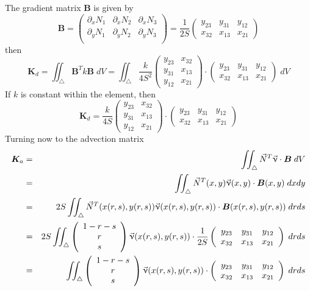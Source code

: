 The gradient matrix ${\bm B}$ is given by 
\[
{\bm B} = 
\left(
\begin{array}{ccc}
\partial_x N_1 & \partial_x N_2 & \partial_x N_3 \\
\partial_y N_1 & \partial_y N_2 & \partial_y N_3 \\
\end{array}
\right)
=
\frac{1}{2S}
\left(
\begin{array}{ccc}
y_{23} & y_{31} & y_{12} \\
x_{32} & x_{13} & x_{21}
\end{array}
\right)
\]
then 
\[
{\bm K}_d 
= \iint_\triangle {\bm B}^T k {\bm B} \; dV
= \iint_\triangle \frac{k}{4S^2}
\left(
\begin{array}{cc}
y_{23} & x_{32} \\ 
y_{31} & x_{13} \\
y_{12} & x_{21}
\end{array}
\right)
\cdot
\left(
\begin{array}{ccc}
y_{23} & y_{31} & y_{12} \\
x_{32} & x_{13} & x_{21}
\end{array}
\right)
\; dV
\]
If $k$ is constant within the element, then 
\[
{\bm K}_d 
= \frac{k}{4S}
\left(
\begin{array}{cc}
y_{23} & x_{32} \\ 
y_{31} & x_{13} \\
y_{12} & x_{21}
\end{array}
\right)
\cdot
\left(
\begin{array}{ccc}
y_{23} & y_{31} & y_{12} \\
x_{32} & x_{13} & x_{21}
\end{array}
\right)
\]
Turning now to the advection matrix
\begin{eqnarray}
{\bm K}_a 
&=& \iint_\triangle \vec{N}^T \vec{\upnu}\cdot {\bm B} \; dV \nonumber\\
&=& \iint_\triangle \vec{N}^T(x,y) \vec{\upnu}(x,y)\cdot {\bm B}(x,y) \; dx dy \nonumber\\
&=& 2S \iint_\triangle \vec{N}^T(x(r,s),y(r,s)) \vec{\upnu}(x(r,s),y(r,s))\cdot {\bm B}(x(r,s),y(r,s)) \; dr ds \nonumber\\
&=& 2S \iint_\triangle 
\left(
\begin{array}{c} 
1-r-s \\ r \\ s 
\end{array}
\right)
\vec{\upnu}(x(r,s),y(r,s))\cdot 
\frac{1}{2S}
\left(
\begin{array}{ccc}
y_{23} & y_{31} & y_{12} \\
x_{32} & x_{13} & x_{21}
\end{array}
\right)
\; dr ds \nonumber\\
&=&  \iint_\triangle 
\left(
\begin{array}{c} 
1-r-s \\ r \\ s 
\end{array}
\right)
\vec{\upnu}(x(r,s),y(r,s))\cdot 
\left(
\begin{array}{ccc}
y_{23} & y_{31} & y_{12} \\
x_{32} & x_{13} & x_{21}
\end{array}
\right)
\; dr ds \nonumber
\end{eqnarray}
